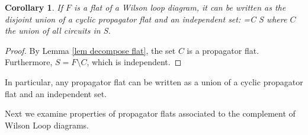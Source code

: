 \documentclass[11pt]{article}
\def\bas #1\eas{\begin{align*} #1 \end{align*}}
\newcommand{\cP}{\mathcal{P}}
\newcommand{\Prop}{\textrm{Prop}}
\newtheorem{cor}[thm]{Corollary}
\theoremstyle{remark}
\theoremstyle{definition}
\newtheorem{dfn}[thm]{Definition}
\begin{document}
\begin{cor} \label{classifyflats}
  If $F$ is a flat of a Wilson loop diagram, it can be written as the disjoint union of a cyclic propagator flat and an independent set: \bas F =C \sqcup S \eas where $C$ the union of all circuits in S. \end{cor}
 
\begin{proof}
By Lemma \ref{lem decompose flat}, the set $C$ is a propagator flat. Furthermore, $S = F \setminus C$, which is independent.
\end{proof}

In particular, any propagator flat can be written as a union of a cyclic propagator flat and an independent set.

Next we examine properties of propagator flats associated to the complement of Wilson Loop diagrams.




\end{document}
